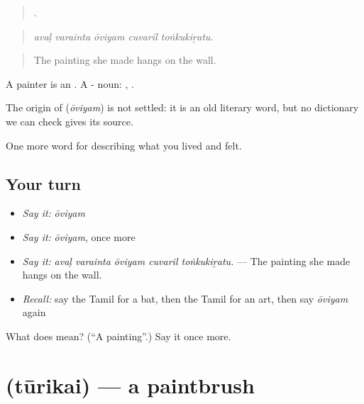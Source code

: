 \begin{quote}
    .
\end{quote}

\begin{quote}
\emph{avaḷ varainta ōviyam cuvaril toṅkukiṟatu.}
\end{quote}

\begin{quote}
The painting she made hangs on the wall.
\end{quote}

A painter is an . A - noun: , .

\begin{cousinweb}
The origin of \textbf{} (\emph{ōviyam}) is not settled: it is an old literary word, but no dictionary we can check gives its source.
\end{cousinweb}

\begin{grammarlens}[title={What you've built}]
One more word for describing what you lived and felt.
\end{grammarlens}

\subsection*{Your turn}
\begin{itemize}
\raggedright
  \item \emph{Say it:} \emph{ōviyam}
  \item \emph{Say it:} \emph{ōviyam}, once more
  \item \emph{Say it:} \emph{avaḷ varainta ōviyam cuvaril toṅkukiṟatu.} — The painting she made hangs on the wall.
  \item \emph{Recall:} say the Tamil for a bat, then the Tamil for an art, then say \emph{ōviyam} again
\end{itemize}

\begin{tcolorbox}[breakable,colback=teal!4,colframe=teal!35!black,title={Before you move on}]
What does  mean? (\textquotedblleft{}A painting\textquotedblright{}.) Say it once more.
\end{tcolorbox}
\section[\texorpdfstring{\ta{தூரிகை} (tūrikai)}{தூரிகை (tūrikai)}]{ (tūrikai) — a paintbrush}

